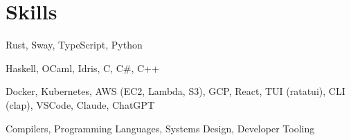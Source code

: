 \section{Skills}

%
{}%
{}%
{\small Rust, Sway, TypeScript, Python \normalsize}%
{}

%
{}%
{}%
{\small Haskell, OCaml, Idris, C, C\#, C++ \normalsize}%
{}

%
{}%
{}%
{\small Docker, Kubernetes, AWS (EC2, Lambda, S3), GCP, React, TUI (ratatui), CLI (clap), VSCode, Claude, ChatGPT \normalsize}%
{}

%
{}%
{}%
{\small Compilers, Programming Languages, Systems Design, Developer Tooling\normalsize}%
{}
